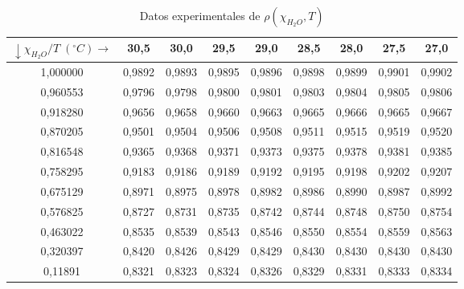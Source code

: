 \documentclass[a4paper,12pt,titlepage]{article}
\begin{document}
\begin{table}[h!]
\centering
\begin{tabular}{|c|c|c|c|c|c|c|c|c|}
\hline
$\downarrow \chi_{H_2O} / T\;(^{\circ}C) \rightarrow$ & 30,5   & 30,0   & 29,5   & 29,0   & 28,5   & 28,0   & 27,5   & 27,0   \\ \hline
1,000000                                              & 0,9892 & 0,9893 & 0,9895 & 0,9896 & 0,9898 & 0,9899 & 0,9901 & 0,9902 \\ \hline
0,960553                                              & 0,9796 & 0,9798 & 0,9800 & 0,9801 & 0,9803 & 0,9804 & 0,9805 & 0,9806 \\ \hline
0,918280                                              & 0,9656 & 0,9658 & 0,9660 & 0,9663 & 0,9665 & 0,9666 & 0,9665 & 0,9667 \\ \hline
0,870205                                              & 0,9501 & 0,9504 & 0,9506 & 0,9508 & 0,9511 & 0,9515 & 0,9519 & 0,9520 \\ \hline
0,816548                                              & 0,9365 & 0,9368 & 0,9371 & 0,9373 & 0,9375 & 0,9378 & 0,9381 & 0,9385 \\ \hline
0,758295                                              & 0,9183 & 0,9186 & 0,9189 & 0,9192 & 0,9195 & 0,9198 & 0,9202 & 0,9207 \\ \hline
0,675129                                              & 0,8971 & 0,8975 & 0,8978 & 0,8982 & 0,8986 & 0,8990 & 0,8987 & 0,8992 \\ \hline
0,576825                                              & 0,8727 & 0,8731 & 0,8735 & 0,8742 & 0,8744 & 0,8748 & 0,8750 & 0,8754 \\ \hline
0,463022                                              & 0,8535 & 0,8539 & 0,8543 & 0,8546 & 0,8550 & 0,8554 & 0,8559 & 0,8563 \\ \hline
0,320397                                              & 0,8420 & 0,8426 & 0,8429 & 0,8429 & 0,8430 & 0,8430 & 0,8430 & 0,8430 \\ \hline
0,11891                                               & 0,8321 & 0,8323 & 0,8324 & 0,8326 & 0,8329 & 0,8331 & 0,8333 & 0,8334 \\ \hline
\end{tabular}
\caption{Datos experimentales de $\rho(\chi_{H_2O},T)$}
\label{tab:my-table}
\end{table}
\end{document}
